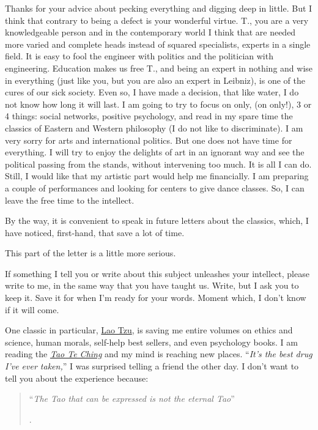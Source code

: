 \documentclass[]{book}
\begin{document}
Thanks for your advice about pecking everything and digging deep in little. But I think that contrary to being a defect is your wonderful virtue. T., you are a very knowledgeable person and in the contemporary world I think that are needed more varied and complete heads instead of squared specialists, experts in a single field. It is easy to fool the engineer with politics and the politician with engineering. Education makes us free T., and being an expert in nothing and wise in everything (just like you, but you are also an expert in Leibniz), is one of the cures of our sick society. Even so, I have made a decision, that like water, I do not know how long it will last. I am going to try to focus on only, (on only!), 3 or 4 things: social networks, positive psychology, and read in my spare time the classics of Eastern and Western philosophy (I do not like to discriminate). I am very sorry for arts and international politics. But one does not have time for everything. I will try to enjoy the delights of art in an ignorant way and see the political passing from the stands, without intervening too much. It is all I can do. Still, I would like that my artistic part would help me financially. I am preparing a couple of performances and looking for centers to give dance classes. So, I can leave the free time to the intellect.

By the way, it is convenient to speak in future letters about the classics, which, I have noticed, first-hand, that save a lot of time.

This part of the letter is a little more serious.

If something I tell you or write about this subject unleashes your intellect, please write to me, in the same way that you have taught us. Write, but I ask you to keep it. Save it for when I'm ready for your words. Moment which, I don't know if it will come.

One classic in particular, \href{https://en.wikipedia.org/wiki/Laozi}{Lao Tzu}, is saving me entire volumes on ethics and science, human morals, self-help best sellers, and even psychology books. I am reading the \href{https://en.wikipedia.org/wiki/Tao_Te_Ching}{\emph{Tao Te Ching}} and my mind is reaching new places. ``\emph{It's the best drug I've ever taken,}'' I was surprised telling a friend the other day. I don't want to tell you about the experience because:

\begin{quote}
``\emph{The Tao that can be expressed is not the eternal Tao}''

\citep{ta1984tao}.
\end{quote}
\end{document}
